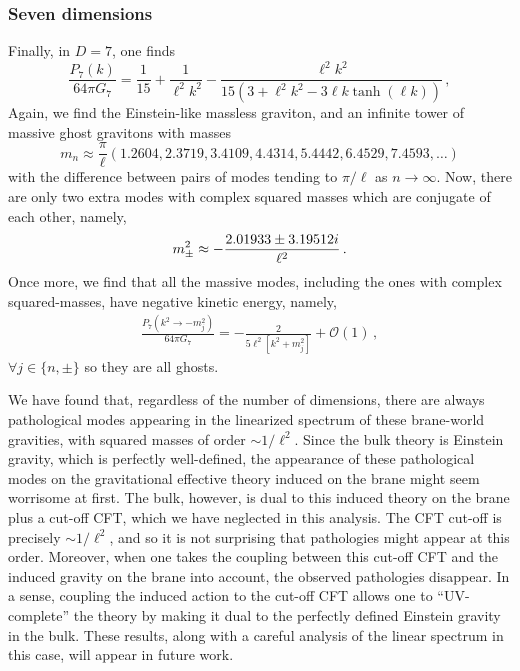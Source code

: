 \documentclass[11pt]{article}
\begin{document}
{\subsubsection{Seven dimensions}
Finally, in $D=7$, one finds
\begin{equation}
\frac{P_{7}(k)}{64 \pi G_7}=\frac{1}{15} + \frac{1}{\ell^2 k^2} - \frac{\ell^2 k^2}{15(3 + \ell^2 k^2 - 3 \ell k \tanh (\ell k))} \, ,
\end{equation}
 Again, we find the Einstein-like massless graviton, and an infinite tower of massive ghost gravitons with masses
 \begin{equation}
 m_n\approx \frac{\pi}{\ell} (1.2604, 2.3719, 3.4109,4.4314, 5.4442,6.4529,7.4593,\dots)
 \end{equation}
 with the difference between pairs of modes tending to $\pi/\ell$ as $n \rightarrow \infty$. Now, there are only two extra modes with complex squared masses which are conjugate of each other, namely,
 \begin{equation}
 m^2_{\rm \pm}\approx -\frac{2.01933 \pm 3.19512 i}{\ell^2}\, .
 \end{equation} 
Once more, we find that all the massive modes, including the ones with complex squared-masses, have negative kinetic energy, namely,
 \begin{align}
\frac{P_{7}(k^2\rightarrow -m_j^2  )}{64\pi G_7}=-\frac{2}{5\ell^2 [k^2+m_j^2]}+\mathcal{O}(1) \, ,
\end{align}
$\forall j \in \{n, \pm \}$ so they are all ghosts.  

We have found that, regardless of the number of dimensions, there are always pathological modes appearing in the linearized spectrum of these brane-world gravities, with squared masses of order $\sim 1/\ell^2$.
Since the bulk theory is Einstein gravity, which is perfectly well-defined, the appearance of these pathological modes on the gravitational effective theory induced on the brane might seem worrisome at first. The bulk, however, is dual to this induced theory on the brane plus a cut-off CFT, which we have neglected in this analysis. The CFT cut-off is precisely $\sim 1/\ell^2$, and so it is not surprising that pathologies might appear at this order.
Moreover, when one takes the coupling between this cut-off CFT and the induced gravity on the brane into account, the observed pathologies disappear. In a sense, coupling the induced action to the cut-off CFT allows one to ``UV-complete'' the theory by making it dual to the perfectly defined Einstein gravity in the bulk. These results, along with a careful analysis of the linear spectrum in this case, will appear in future work.

}
\end{document}
